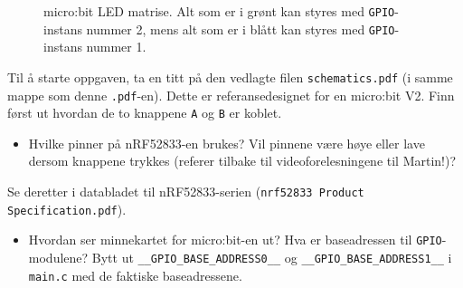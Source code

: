 \begin{figure}[ht]
{}
    \caption{micro:bit LED matrise. Alt som er i grønt kan styres med \texttt{GPIO}-instans nummer 2, mens alt som er i blått kan styres med \texttt{GPIO}-instans nummer 1.}
    \label{fig:microbit-led}
\end{figure}

Til å starte oppgaven, ta en titt på den vedlagte filen \verb|schematics.pdf| (i samme mappe som denne \verb|.pdf|-en). Dette er referansedesignet for en micro:bit V2. Finn først ut hvordan de to knappene \verb|A| og \verb|B| er koblet. 

\begin{itemize}
    \item Hvilke pinner på nRF52833-en brukes? Vil pinnene være høye eller lave dersom knappene trykkes (referer tilbake til videoforelesningene til Martin!)?
\end{itemize}



Se deretter i databladet til nRF52833-serien (\texttt{nrf52833 Product Specification.pdf}). 

\begin{itemize}
    \item Hvordan ser minnekartet for micro:bit-en ut? Hva er baseadressen til \verb|GPIO|-modulene? Bytt ut \verb|__GPIO_BASE_ADDRESS0__| og \verb|__GPIO_BASE_ADDRESS1__| i \verb|main.c| med de faktiske baseadressene. 
\end{itemize}

